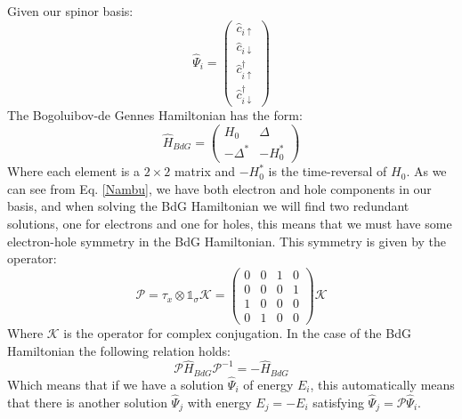 \documentclass[letterpaper,12pt]{article}
\begin{document}
Given our spinor basis:
\begin{equation}
\hat{\Psi}_{i} = 
    \begin{pmatrix}
    \hat{c}_{i\uparrow} \\
    \hat{c}_{i\downarrow} \\
    \hat{c}_{i\uparrow}^\dagger\\
    \hat{c}_{i\downarrow}^\dagger 
    \end{pmatrix}
    \label{Nambu}
\end{equation}
The Bogoluibov-de Gennes Hamiltonian has the form:
\begin{equation}
    \hat{H}_{BdG} =
        \begin{pmatrix}
        H_0 & \Delta \\
        -\Delta^* & -H_0^*
        \end{pmatrix}
\end{equation}
Where each element is a $2\times2$ matrix and $-H_0^*$ is the time-reversal of $H_0$. As we can see from Eq. \ref{Nambu}, we have both electron and hole components in our basis, and when solving the BdG Hamiltonian we will find two redundant solutions, one for electrons and one for holes, this means that we must have some electron-hole symmetry in the BdG Hamiltonian. This symmetry is given by the operator:
\begin{equation}
    \mathcal{P} = \tau_x \otimes \mathbb{1}_\sigma \mathcal{K} = 
    \begin{pmatrix}
    0 & 0 & 1 & 0\\
    0 & 0 & 0 & 1\\
    1 & 0 & 0 & 0\\
    0 & 1 & 0 & 0
    \end{pmatrix}\mathcal{K}
\end{equation}
Where $\mathcal{K}$ is the operator for complex conjugation. In the case of the BdG Hamiltonian the following relation holds:
\begin{equation}
    \mathcal{P}\hat{H}_{BdG}\mathcal{P}^{-1} = - \hat{H}_{BdG}
\end{equation}
Which means that if we have a solution $\hat{\Psi}_{i}$ of energy $E_i$, this automatically means that there is another solution $\hat{\Psi}_{j}$ with energy $E_j = -E_i$ satisfying $\hat{\Psi}_{j} = \mathcal{P}\hat{\Psi}_{i}$.


{}

\end{document}
